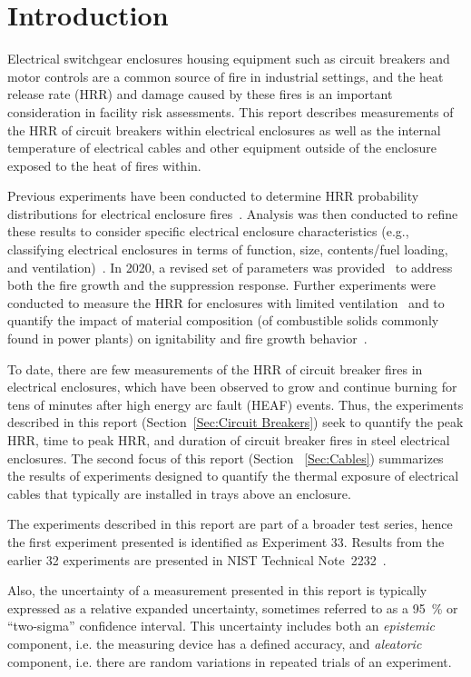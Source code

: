 \section{Introduction}

Electrical switchgear enclosures housing equipment such as circuit breakers and motor controls are a common source of fire in industrial settings, and the heat release rate (HRR) and damage caused by these fires is an important consideration in facility risk assessments. This report describes measurements of the HRR of circuit breakers within electrical enclosures as well as the internal temperature of electrical cables and other equipment outside of the enclosure exposed to the heat of fires within.

Previous experiments have been conducted to determine HRR probability distributions for electrical enclosure fires~\cite{NUREG/CR-7197}. Analysis was then conducted to refine these results to consider specific electrical enclosure characteristics (e.g., classifying electrical enclosures in terms of function, size, contents/fuel loading, and ventilation)~\cite{NUREG-2178}. In 2020, a revised set of parameters was provided~\cite{NUREG2230} to address both the fire growth and the suppression response. Further experiments were conducted to measure the HRR for enclosures with limited ventilation~\cite{OLIVE-FIRE} and to quantify the impact of material composition (of combustible solids commonly found in power plants) on ignitability and fire growth behavior~\cite{leventon2024nist}.

To date, there are few measurements of the HRR of circuit breaker fires in electrical enclosures, which have been observed to grow and continue burning for tens of minutes after high energy arc fault (HEAF) events. Thus, the experiments described in this report (Section~\ref{Sec:Circuit Breakers}) seek to quantify the peak HRR, time to peak HRR, and duration of circuit breaker fires in steel electrical enclosures. The second focus of this report (Section~ \ref{Sec:Cables}) summarizes the results of experiments designed to quantify the thermal exposure of electrical cables that typically are installed in trays above an enclosure.

The experiments described in this report are part of a broader test series, hence the first experiment presented is identified as Experiment 33. Results from the earlier 32 experiments are presented in NIST Technical Note~2232~\cite{OLIVE-FIRE}.

Also, the uncertainty of a measurement presented in this report is typically expressed as a relative expanded uncertainty, sometimes referred to as a 95~\% or ``two-sigma'' confidence interval. This uncertainty includes both an {\em epistemic} component, i.e. the measuring device has a defined accuracy, and {\em aleatoric} component, i.e. there are random variations in repeated trials of an experiment.

